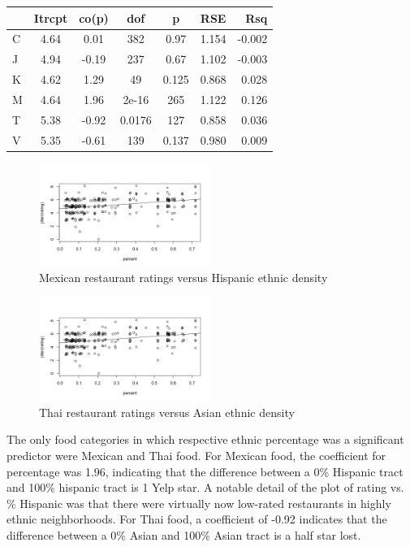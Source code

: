 \documentclass[11pt,twocolumn]{article}
\begin{document}
\begin{center}
  \begin{tabular}{| l | c | c | c | c | c | r | }
    \hline
     & Itrcpt & co(p) & dof & p & RSE & Rsq \\ \hline \hline
    C & 4.64 & 0.01 & 382 & 0.97 & 1.154 & -0.002 \\ \hline
    J & 4.94 & -0.19 & 237 & 0.67 & 1.102 & -0.003 \\ \hline
    K & 4.62 & 1.29 & 49 & 0.125 & 0.868 & 0.028 \\ \hline
    M & 4.64 & 1.96 & 2e-16 & 265 & 1.122 & 0.126 \\ \hline
    T & 5.38 & -0.92 & 0.0176 & 127 & 0.858 & 0.036 \\ \hline
    V & 5.35 & -0.61 & 139 & 0.137 & 0.980 & 0.009 \\
    \hline
  \end{tabular}
\end{center}

\begin{figure}[h!]
  \caption{Mexican restaurant ratings versus Hispanic ethnic density}
  \centering
  \includegraphics[width=0.5\textwidth]{mexican_regression}
\end{figure}

\begin{figure}[h!]
  \caption{Thai restaurant ratings versus Asian ethnic density}
  \centering
  \includegraphics[width=0.5\textwidth]{mexican_regression}
\end{figure}

The only food categories in which respective ethnic percentage was a significant predictor were Mexican and Thai food. For Mexican food, the coefficient for percentage was 1.96, indicating that the difference between a 0\% Hispanic tract and 100\% hispanic tract is 1 Yelp star. A notable detail of the plot of rating vs. \% Hispanic was that there were virtually now low-rated restaurants in highly ethnic neighborhoods. For Thai food, a coefficient of -0.92 indicates that the difference between a 0\% Asian and 100\% Asian tract is a half star lost.
\end{document}
